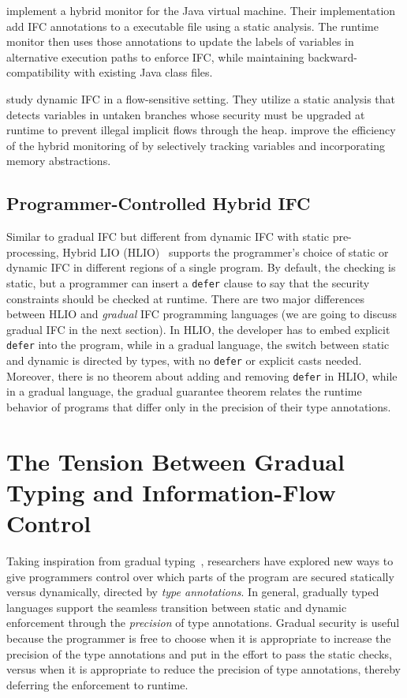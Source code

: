 \textcite{Chandra:2007we} implement a hybrid monitor for the Java virtual
machine. Their implementation add IFC annotations to a executable file using a
static analysis. The runtime monitor then uses those annotations to update the
labels of variables in alternative execution paths to enforce IFC, while
maintaining backward-compatibility with existing Java class files.

\textcite{russo2010dynamic} study dynamic IFC in a flow-sensitive setting. They
utilize a static analysis that detects variables in untaken branches whose
security must be upgraded at runtime to prevent illegal implicit flows
through the heap. \textcite{moore2011static} improve the efficiency of the
hybrid monitoring of \textcite{russo2010dynamic} by selectively tracking
variables and incorporating memory abstractions.

\subsection{Programmer-Controlled Hybrid IFC}
\label{sec:intro-hybrid}

Similar to gradual IFC but different from dynamic IFC with static
pre-processing, Hybrid LIO (HLIO)~\cite{Buiras:2015aa} supports the programmer's
choice of static or dynamic IFC in different regions of a single program. By
default, the checking is static, but a programmer can insert a \texttt{defer}
clause to say that the security constraints should be checked at runtime. There
are two major differences between HLIO and \textit{gradual} IFC programming
languages (we are going to discuss gradual IFC in the next section). In HLIO,
the developer has to embed explicit \texttt{defer} into the program, while in a
gradual language, the switch between static and dynamic is directed by types,
with no \texttt{defer} or explicit casts needed. Moreover, there is no theorem
about adding and removing \texttt{defer} in HLIO, while in a gradual language,
the gradual guarantee theorem relates the runtime behavior of programs that
differ only in the precision of their type annotations.

\section{The Tension Between Gradual Typing and Information-Flow Control}
\label{sec:intro-gradual-ifc}

Taking inspiration from gradual typing~\parencite{Siek:2006bh,Siek:2007qy},
researchers have explored new ways to give programmers control over which parts
of the program are secured statically versus dynamically, directed by
\textit{type annotations}. In general, gradually typed languages support the
seamless transition between static and dynamic enforcement through the
\textit{precision} of type annotations. Gradual security is useful because the
programmer is free to choose when it is appropriate to increase the precision of
the type annotations and put in the effort to pass the static checks, versus
when it is appropriate to reduce the precision of type annotations, thereby
deferring the enforcement to runtime.

